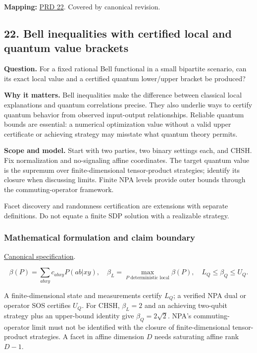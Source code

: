 \documentclass[
  11pt,
]{article}
\begin{document}
\textbf{Mapping:}
\href{https://github.com/rick-stevens-ai/Pure-Thought/blob/main/PRDs/22-Bell-Inequalities-Nonlocality.md}{PRD
22}. Covered by canonical revision.

\subsection{22. Bell inequalities with certified local and quantum value
brackets}

\textbf{Question.} For a fixed rational Bell functional in a small
bipartite scenario, can its exact local value and a certified quantum
lower/upper bracket be produced?

\textbf{Why it matters.} Bell inequalities make the difference between
classical local explanations and quantum correlations precise. They also
underlie ways to certify quantum behavior from observed input-output
relationships. Reliable quantum bounds are essential: a numerical
optimization value without a valid upper certificate or achieving
strategy may misstate what quantum theory permits.

\textbf{Scope and model.} Start with two parties, two binary settings
each, and CHSH. Fix normalization and no-signaling affine coordinates.
The target quantum value is the supremum over finite-dimensional
tensor-product strategies; identify its closure when discussing limits.
Finite NPA levels provide outer bounds through the commuting-operator
framework.

Facet discovery and randomness certification are extensions with
separate definitions. Do not equate a finite SDP solution with a
realizable strategy.

\subsubsection{Mathematical formulation and claim boundary}

\href{https://github.com/rick-stevens-ai/Pure-Thought/blob/main/PRDs/22-Bell-Inequalities-Nonlocality.md}{Canonical
specification}.

\[\beta(P)=\sum_{abxy}c_{abxy}P(ab|xy),\quad
\beta_L=\max_{P\text{ deterministic local}}\beta(P),\quad
L_Q\le\beta_Q\le U_Q.\]

A finite-dimensional state and measurements certify \(L_Q\); a verified
NPA dual or operator SOS certifies \(U_Q\). For CHSH, \(\beta_L=2\) and
an achieving two-qubit strategy plus an upper-bound identity give
\(\beta_Q=2\sqrt2\). NPA's commuting-operator limit must not be
identified with the closure of finite-dimensional tensor-product
strategies. A facet in affine dimension \(D\) needs saturating affine
rank \(D-1\).
\end{document}
